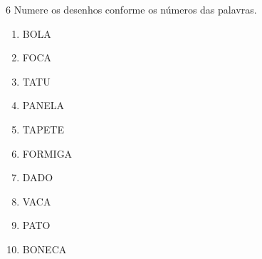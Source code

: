 \pagebreak
\num{6} Numere os desenhos conforme os números das palavras.


\begin{multicols}{3}
\begin{enumerate}
\item BOLA

\item FOCA

\item TATU

\item PANELA

\item TAPETE

\item FORMIGA

\item DADO

\item VACA

\item PATO

\item BONECA
\end{enumerate}
\end{multicols}

